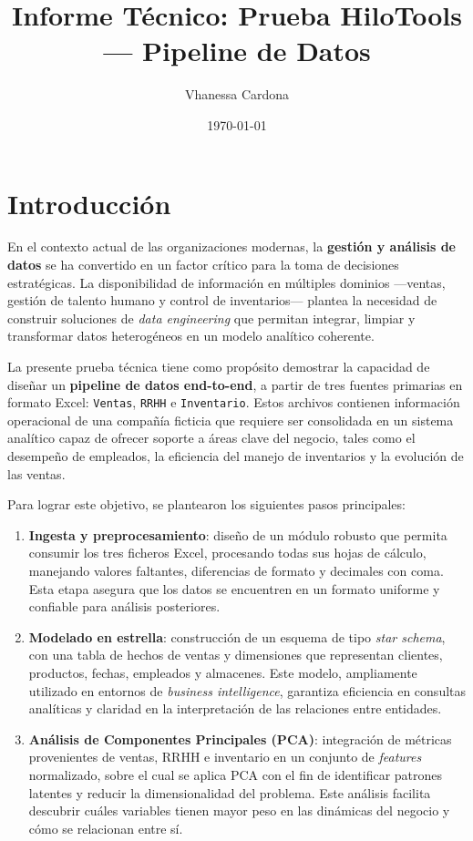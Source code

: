 \documentclass[12pt,a4paper]{article}
\title{Informe Técnico: Prueba HiloTools — Pipeline de Datos}
\author{Vhanessa Cardona}
\date{\today}
\begin{document}
\maketitle

\tableofcontents
\newpage

\section{Introducción}

En el contexto actual de las organizaciones modernas, la \textbf{gestión y análisis de datos} 
se ha convertido en un factor crítico para la toma de decisiones estratégicas. 
La disponibilidad de información en múltiples dominios ---ventas, gestión de talento humano 
y control de inventarios--- plantea la necesidad de construir soluciones de \textit{data engineering} 
que permitan integrar, limpiar y transformar datos heterogéneos en un modelo analítico coherente.

La presente prueba técnica tiene como propósito demostrar la capacidad de diseñar un 
\textbf{pipeline de datos end-to-end}, a partir de tres fuentes primarias en formato Excel: 
\texttt{Ventas}, \texttt{RRHH} e \texttt{Inventario}. Estos archivos contienen información 
operacional de una compañía ficticia que requiere ser consolidada en un sistema analítico 
capaz de ofrecer soporte a áreas clave del negocio, tales como el desempeño de empleados, 
la eficiencia del manejo de inventarios y la evolución de las ventas.

Para lograr este objetivo, se plantearon los siguientes pasos principales:

\begin{enumerate}
    \item \textbf{Ingesta y preprocesamiento}: diseño de un módulo robusto que permita consumir 
    los tres ficheros Excel, procesando todas sus hojas de cálculo, manejando valores faltantes, 
    diferencias de formato y decimales con coma. Esta etapa asegura que los datos se encuentren 
    en un formato uniforme y confiable para análisis posteriores.

    \item \textbf{Modelado en estrella}: construcción de un esquema de tipo \textit{star schema}, 
    con una tabla de hechos de ventas y dimensiones que representan clientes, productos, fechas, 
    empleados y almacenes. Este modelo, ampliamente utilizado en entornos de \textit{business intelligence}, 
    garantiza eficiencia en consultas analíticas y claridad en la interpretación de las relaciones entre entidades.

    \item \textbf{Análisis de Componentes Principales (PCA)}: integración de métricas provenientes 
    de ventas, RRHH e inventario en un conjunto de \textit{features} normalizado, sobre el cual se aplica 
    PCA con el fin de identificar patrones latentes y reducir la dimensionalidad del problema. 
    Este análisis facilita descubrir cuáles variables tienen mayor peso en las dinámicas del negocio 
    y cómo se relacionan entre sí.
\end{enumerate}
\end{document}

